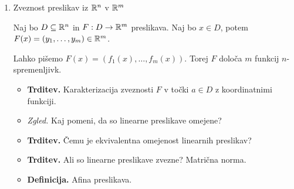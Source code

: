 \begin{enumerate}
    \item Zveznost preslikav iz $\mathbb{R}^n$ v $\mathbb{R}^m$
    
    Naj bo $D \subseteq \mathbb{R}^n$ in $F: D \to \mathbb{R}^m$ preslikava. Naj bo $x \in D$, potem $F(x) = (y_1, \ldots, y_m) \in \mathbb{R}^m$.

    Lahko pišemo $F(x) = (f_1(x), \ldots, f_m(x))$. Torej $F$ določa $m$ funkcij $n$-spremenljivk.
    \begin{itemize}
        \item \colorbox{blue!30}{\textbf{Trditev.}} Karakterizacija zveznosti $F$ v točki $a \in D$ z koordinatnimi funkciji.
        \item \colorbox{yellow!30}{\emph{Zgled.}} Kaj pomeni, da so linearne preslikave omejene? \todo{*}
        \item \colorbox{blue!30}{\textbf{Trditev.}} Čemu je ekvivalentna omejenost linearnih preslikav?
        \item \colorbox{blue!30}{\textbf{Trditev.}} Ali so linearne preslikave zvezne? Matrična norma.
        \item \colorbox{purple!30}{\textbf{Definicija.}} Afina preslikava.
    \end{itemize}
\end{enumerate}

\newpage
